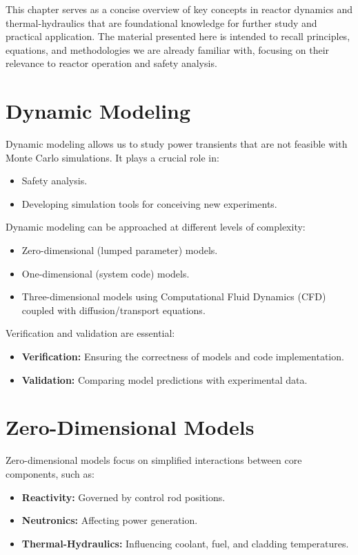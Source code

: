 This chapter serves as a concise overview of key concepts in reactor dynamics and thermal-hydraulics that are foundational knowledge for further study and practical application. The material presented here is intended to recall principles, equations, and methodologies we are already familiar with, focusing on their relevance to reactor operation and safety analysis.

\section{Dynamic Modeling}

Dynamic modeling allows us to study power transients that are not feasible with Monte Carlo simulations. It plays a crucial role in:
\begin{itemize}
    \item Safety analysis.
    \item Developing simulation tools for conceiving new experiments.
\end{itemize}

Dynamic modeling can be approached at different levels of complexity:
\begin{itemize}
    \item Zero-dimensional (lumped parameter) models.
    \item One-dimensional (system code) models.
    \item Three-dimensional models using Computational Fluid Dynamics (CFD) coupled with diffusion/transport equations.
\end{itemize}

Verification and validation are essential:
\begin{itemize}
    \item \textbf{Verification:} Ensuring the correctness of models and code implementation.
    \item \textbf{Validation:} Comparing model predictions with experimental data.
\end{itemize}

\section{Zero-Dimensional Models}

Zero-dimensional models focus on simplified interactions between core components, such as:
\begin{itemize}
    \item \textbf{Reactivity:} Governed by control rod positions.
    \item \textbf{Neutronics:} Affecting power generation.
    \item \textbf{Thermal-Hydraulics:} Influencing coolant, fuel, and cladding temperatures.
\end{itemize}

